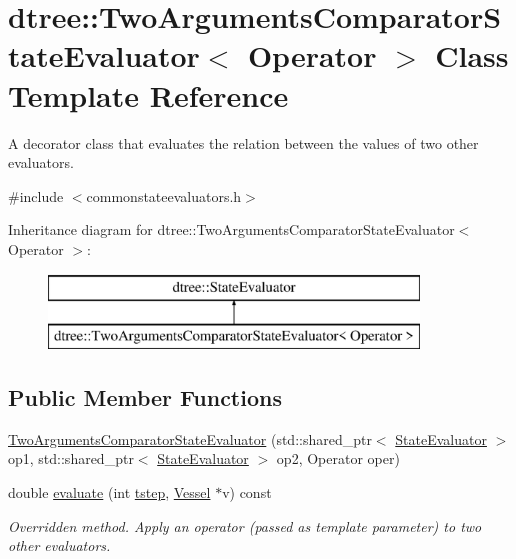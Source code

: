 \hypertarget{classdtree_1_1_two_arguments_comparator_state_evaluator}{}\section{dtree\+::Two\+Arguments\+Comparator\+State\+Evaluator$<$ Operator $>$ Class Template Reference}
\label{classdtree_1_1_two_arguments_comparator_state_evaluator}


A decorator class that evaluates the relation between the values of two other evaluators.  




{\ttfamily \#include $<$commonstateevaluators.\+h$>$}

Inheritance diagram for dtree\+::Two\+Arguments\+Comparator\+State\+Evaluator$<$ Operator $>$\+:\begin{figure}[H]
\begin{center}
\leavevmode
\includegraphics[height=2.000000cm]{da/d93/classdtree_1_1_two_arguments_comparator_state_evaluator}
\end{center}
\end{figure}
\subsection*{Public Member Functions}
\begin{DoxyCompactItemize}
\item 
\mbox{\hyperlink{classdtree_1_1_two_arguments_comparator_state_evaluator_ad56c4a9189177c56c6337d89e1c11acd}{Two\+Arguments\+Comparator\+State\+Evaluator}} (std\+::shared\+\_\+ptr$<$ \mbox{\hyperlink{classdtree_1_1_state_evaluator}{State\+Evaluator}} $>$ op1, std\+::shared\+\_\+ptr$<$ \mbox{\hyperlink{classdtree_1_1_state_evaluator}{State\+Evaluator}} $>$ op2, Operator oper)
\item 
double \mbox{\hyperlink{classdtree_1_1_two_arguments_comparator_state_evaluator_a66c62d16f835b0fb914cb7b407fe079d}{evaluate}} (int \mbox{\hyperlink{thread__vessels_8cpp_a84bc73d278de929ec9974e1a95d9b23a}{tstep}}, \mbox{\hyperlink{class_vessel}{Vessel}} $\ast$v) const
\begin{DoxyCompactList}\small\item\em Overridden method. Apply an operator (passed as template parameter) to two other evaluators. \end{DoxyCompactList}\end{DoxyCompactItemize}


